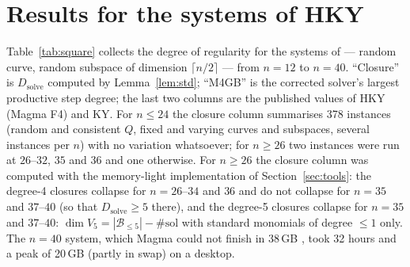\documentclass[11pt,a4paper]{article}
\theoremstyle{remark}\newtheorem{remark}{Remark}
\newcommand{\B}{\mathcal{B}}
\newcommand{\Dsolve}{D_{\mathrm{solve}}}
\begin{document}
\section{Results for the systems of HKY}\label{sec:results}

Table~\ref{tab:square} collects the degree of regularity for the systems of \cite[Sec.~5.2]{HKY15} --- random curve, random subspace of dimension $\lceil n/2\rceil$ --- from $n=12$ to $n=40$. ``Closure'' is $\Dsolve$ computed by Lemma~\ref{lem:std}; ``M4GB'' is the corrected solver's largest productive step degree; the last two columns are the published values of HKY (Magma F4) and KY. For $n\le24$ the closure column summarises 378 instances (random and consistent $Q$, fixed and varying curves and subspaces, several instances per $n$) with no variation whatsoever; for $n\ge26$ two instances were run at $26$--$32$, $35$ and $36$ and one otherwise. For $n\ge26$ the closure column was computed with the memory-light implementation of Section~\ref{sec:tools}: the degree-4 closures collapse for $n=26$--$34$ and $36$ and do not collapse for $n=35$ and $37$--$40$ (so that $\Dsolve\ge5$ there), and the degree-5 closures collapse for $n=35$ and $37$--$40$: $\dim V_5=|\B_{\le5}|-\#\text{sol}$ with standard monomials of degree $\le1$ only. The $n=40$ system, which Magma could not finish in 38\,GB \cite{KY15}, took 32 hours and a peak of 20\,GB (partly in swap) on a desktop.
\end{document}

